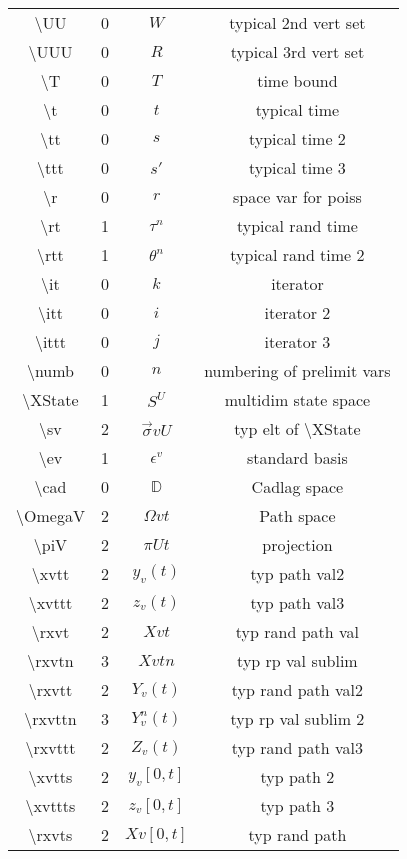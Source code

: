 \documentclass[12pt]{article}
\newcommand{\mb}{\mathbb}
\newcommand{\ep}{\epsilon}
\newcommand{\tbs}{\textbackslash}
\newcommand{\cad}{\mb{D}}							%
\renewcommand{\v}{v}							%
\renewcommand{\U}{U}							%
\newcommand{\UU}{W}								%
\newcommand{\UUU}{R}							%
\renewcommand{\S}{S}							%
\newcommand{\s}{\sigma}							%
\newcommand{\sv}{\vec{\s}}						%
\newcommand{\ev}[1]{\ep^{#1}}					%
\newcommand{\T}{T}								%
\renewcommand{\t}{t}							%
\newcommand{\proj}{\pi}							%
\renewcommand{\tt}{s}							%
\newcommand{\ttt}{s'}							%
\newcommand{\X}{X}								%
\renewcommand{\r}{r}								%
\newcommand{\rt}[1]{\tau^{#1}}						%
\newcommand{\rtt}[1]{\theta^{#1}}					%
\renewcommand{\it}{k}								%
\newcommand{\itt}{i}								%
\newcommand{\ittt}{j}								%
\newcommand{\numb}{n}								%
\newcommand{\XState}[1]{\S^{#1}}				%
\newcommand{\xvtt}[2]{y_{#1}{(#2)}}					%
\newcommand{\xvttt}[2]{z_{#1}{(#2)}}				%
\newcommand{\rxvtt}[2]{Y_{#1}{(#2)}}				%
\newcommand{\rxvttn}[3]{Y_{#1}^{#3}(#2)}			%
\newcommand{\rxvttt}[2]{Z_{#1}{(#2)}}				%
\newcommand{\xvtts}[2]{y_{#1}{#2}}					%
\newcommand{\xvttts}[2]{z_{#1}{#2}}					%
\begin{document}
\begin{longtable}{c|c|c|c}
\tbs UU&0&\(\UU\)								&typical 2nd vert set\\
\tbs UUU&0&\(\UUU\)								&typical 3rd vert set\\
\tbs T&0&\(\T\)									&time bound\\
\tbs t&0&\(\t\)								&typical time\\
\tbs tt&0&\(\tt\)								&typical time 2\\
\tbs ttt&0&\(\ttt\)							&typical time 3\\
\tbs r&0&\(\r\)								&space var for poiss\\
\tbs rt&1&\(\rt{\numb}\)					&typical rand time\\
\tbs rtt&1&\(\rtt{\numb}\)					&typical rand time 2\\
\tbs it&0& \(\it\)							&iterator\\
\tbs itt&0&\(\itt\)							&iterator 2\\
\tbs ittt&0&\(\ittt\)						&iterator 3\\
\tbs numb&0&\(\numb\)						&numbering of prelimit vars\\
\tbs XState&1&\(\XState{\U}\)				&multidim state space\\
\tbs sv&2&\(\sv{\v}{\U}\)					&typ elt of \tbs XState\\
\tbs ev&1&\(\ev{\v}\)						&standard basis\\
\tbs cad&0&\(\cad\)							&Cadlag space\\
\tbs OmegaV&2&\(\Omega{\v}{\t}\)			&Path space\\
\tbs piV&2&\(\proj{\U}{t}\)					&projection\\
\tbs xvtt&2&\(\xvtt{\v}{\t}\)					&typ path val2\\
\tbs xvttt&2&\(\xvttt{\v}{\t}\)				&typ path val3\\
\tbs rxvt&2&\(\X{\v}{\t}\)					&typ rand path val\\
\tbs rxvtn&3&\(\X{\v}{\t}{\numb}\)		&typ rp val sublim\\
\tbs rxvtt&2&\(\rxvtt{\v}{\t}\)				&typ rand path val2\\
\tbs rxvttn&3&\(\rxvttn{\v}{\t}{\numb}\)		&typ rp val sublim 2\\
\tbs rxvttt&2&\(\rxvttt{\v}{\t}\)				&typ rand path val3\\
\tbs xvtts&2&\(\xvtts{\v}{[0,\t]}\)					&typ path 2\\
\tbs xvttts&2&\(\xvttts{\v}{[0,\t]}\)					&typ path 3\\
\tbs rxvts&2&\(\X{\v}{[0,\t]}\)					&typ rand path\\

\end{longtable}
\end{document}
